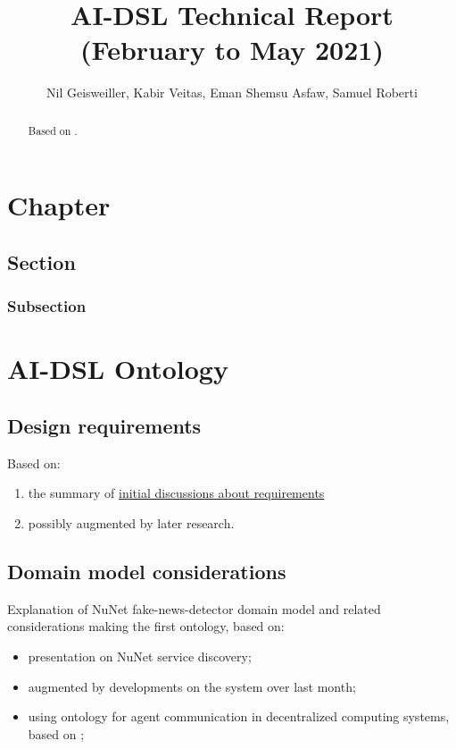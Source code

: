 \documentclass[]{report}
\begin{document}
\title{AI-DSL Technical Report (February to May 2021)}
\author{Nil Geisweiller, Kabir Veitas, Eman Shemsu Asfaw, Samuel Roberti}
\maketitle

\begin{abstract}
  Based on \cite{GoertzelGeisweillerBlog}.
\end{abstract}


\tableofcontents

\chapter{Chapter}
\section{Section}
\subsection{Subsection}


\chapter{AI-DSL Ontology}

\section{Design requirements}

Based on:
\begin{enumerate}
	\item the summary of \href{https://github.com/nunet-io/ai-dsl-ontology/wiki}{initial discussions about requirements}
	\item possibly augmented by later research.
\end{enumerate}

\section{Domain model considerations}

Explanation of NuNet fake-news-detector domain model and related considerations  making the first ontology, based on:
\begin{itemize}
	\item presentation on NuNet service discovery;
	\item augmented by developments on the system over last month;
	\item using ontology for agent communication in decentralized computing systems, based on \cite{YvesHellenschmidt2002};
\end{itemize}
\end{document}
